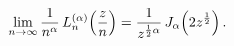 \[\lim_{n\to\infty}\frac{1}{n^{\alpha}}\mathop{L^{(\alpha)}_{n}\/}\nolimits\!%
\left(\frac{z}{n}\right)=\frac{1}{z^{\frac{1}{2}\alpha}}\mathop{J_{\alpha}\/}%
\nolimits\!\left(2z^{\frac{1}{2}}\right).\]